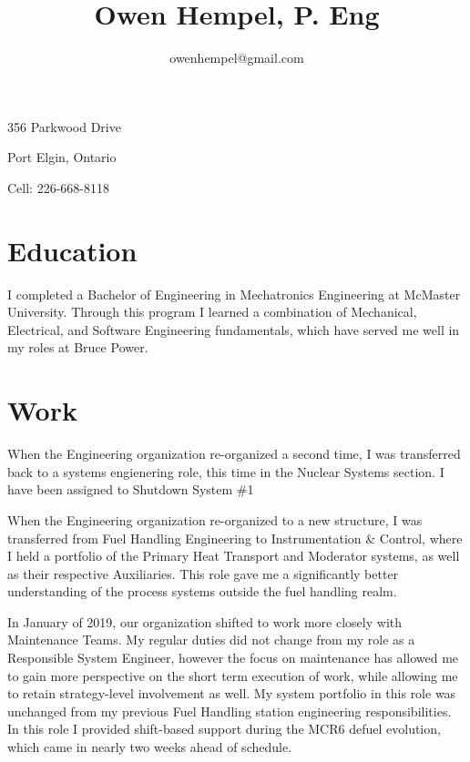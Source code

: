 \documentclass{my_cv}
\title{\bfseries\Huge Owen Hempel, P. Eng}
\author{owenhempel@gmail.com}
\date{}
\begin{document}
\maketitle

\vspace{1em}
\begin{minipage}[ht]{0.48\textwidth}
356 Parkwood Drive

Port Elgin, Ontario
\end{minipage}
\begin{minipage}[ht]{0.48\textwidth}
Cell: 226-668-8118
\end{minipage}


\section{Education}
I completed a Bachelor of Engineering in Mechatronics Engineering at McMaster University. Through this program I learned a combination of Mechanical, Electrical, and Software Engineering fundamentals, which have served me well in my roles at Bruce Power.

\section{Work}
When the Engineering organization re-organized a second time, I was transferred back to a systems engienering role, this time in the Nuclear Systems section. I have been assigned to Shutdown System \#1


When the Engineering organization re-organized to a new structure, I was transferred from Fuel Handling Engineering to Instrumentation \& Control, where I held a portfolio of the Primary Heat Transport and Moderator systems, as well as their respective Auxiliaries. This role gave me a significantly better understanding of the process systems outside the fuel handling realm. 


In January of 2019, our organization shifted to work more closely with Maintenance Teams. My regular duties did not change from my role as a Responsible System Engineer, however the focus on maintenance has allowed me to gain more perspective on the short term execution of work, while allowing me to retain strategy-level involvement as well. My system portfolio in this role was unchanged from my previous Fuel Handling station engineering responsibilities. In this role I provided shift-based support during the MCR6 defuel evolution, which came in nearly two weeks ahead of schedule.
\end{document}
